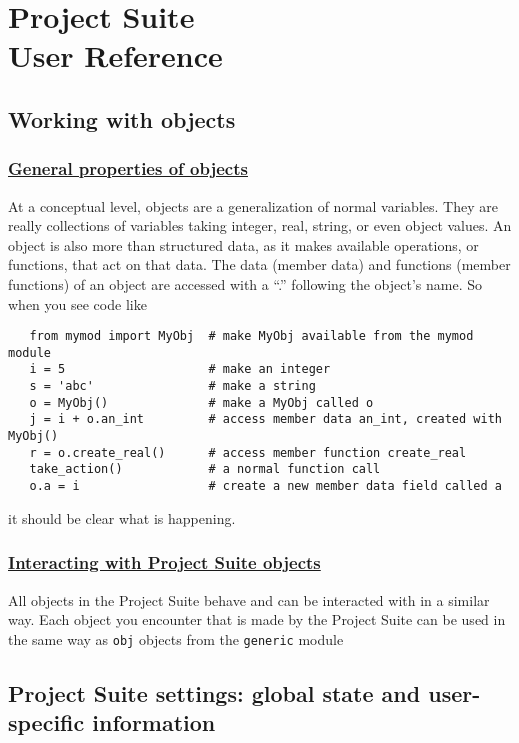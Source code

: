 \documentclass[oneside,11pt]{memoir}
\numberwithin{equation}{section}
\newcommand{\condense}[1]{{#1}}
\newcommand{\bu}[1]{\textbf{\underline{#1}}}
\begin{document}
\pagebreak
\chapter{Project Suite \\User Reference} \label{reference}


\section{Working with objects}
\subsection{\bu{General properties of objects}}
At a conceptual level, objects are a generalization of normal variables.  
They are really collections of variables taking integer, real, string, or 
even object values.  An object is also more than structured data, as it 
makes available operations, or functions, that act on that data.  The data 
(member data) and functions (member functions) of an object are accessed with 
a ``.'' following the object's name.  So when you see code like
\begin{shaded}
\begin{verbatim}
   from mymod import MyObj  # make MyObj available from the mymod module
   i = 5                    # make an integer
   s = 'abc'                # make a string
   o = MyObj()              # make a MyObj called o
   j = i + o.an_int         # access member data an_int, created with MyObj() 
   r = o.create_real()      # access member function create_real
   take_action()            # a normal function call
   o.a = i                  # create a new member data field called a
\end{verbatim}
\end{shaded}
it should be clear what is happening.

\subsection{\bu{Interacting with Project Suite objects}}
All objects in the Project Suite behave and can be interacted with in a 
similar way.  Each object you encounter that is made by the Project Suite 
can be used in the same way as \texttt{obj} objects from the \texttt{generic} 
module

\section{Project Suite settings: global state and user-specific information}
\end{document}

